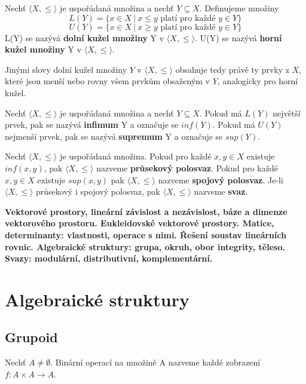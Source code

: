 \begin{definition}
	Nechť $\langle X, \leq \rangle$ je uspořádaná množina a nechť $Y \subseteq X$. Definujeme množiny
	$$L(Y) = \{ x \in X \ | \ x \leq y \text{ platí pro každé } y \in Y\}$$
	$$U(Y) =  \{ x \in X \ | \ x \geq y \text{ platí pro každé } y \in Y\}$$
	L(Y) se nazývá \textbf{dolní kužel množiny} Y v  $\langle X, \leq \rangle$. U(Y) se nazývá \textbf{horní kužel množiny} Y v  $\langle X, \leq \rangle$.
\end{definition}

Jinými slovy dolní kužel množiny $Y$ v  $\langle X, \leq \rangle$ obsahuje tedy právě ty prvky z $X$, které jsou menší nebo rovny všem prvkům obsaženým v $Y$, analogicky pro horní kužel.

\begin{definition}
	Nechť  $\langle X, \leq \rangle$ je uspořádaná množina a nechť $Y \subseteq X$. Pokud má $L(Y)$ největší prvek, pak se nazývá \textbf{infimum} Y a označuje se $inf(Y)$. Pokud má $U(Y)$ nejmenší prvek, pak se nazývá \textbf{supremum} Y a označuje se $sup(Y)$.
\end{definition}

\begin{definition}
	Nechť  $\langle X, \leq \rangle$ je uspořádaná množina. Pokud pro každé $x,y \in X$ existuje $inf(x,y)$, pak  $\langle X, \leq \rangle$ nazveme \textbf{průsekový polosvaz}. Pokud pro každé $x,y \in X$ existuje $sup(x,y)$ pak  $\langle X, \leq \rangle$ nazveme \textbf{spojový polosvaz}. Je-li  $\langle X, \leq \rangle$ průsekový i spojový polosvaz, pak  $\langle X, \leq \rangle$ nazveme \textbf{svaz}.
\end{definition}

\newpage
\textbf{Vektorové prostory, lineární závislost a nezávislost, báze a dimenze vektorového prostoru. Eukleidovské vektorové
prostory. Matice, determinanty: vlastnosti, operace s nimi. Řešení soustav lineárních rovnic. Algebraické
struktury: grupa, okruh, obor integrity, těleso. Svazy: modulární, distributivní, komplementární.}

\section{Algebraické struktury}
\subsection{Grupoid}
\begin{definition}
	Nechť $A \not= \emptyset$. Binární operací na množině A nazveme každé zobrazení $f : A \times A \rightarrow A$.
\end{definition}

